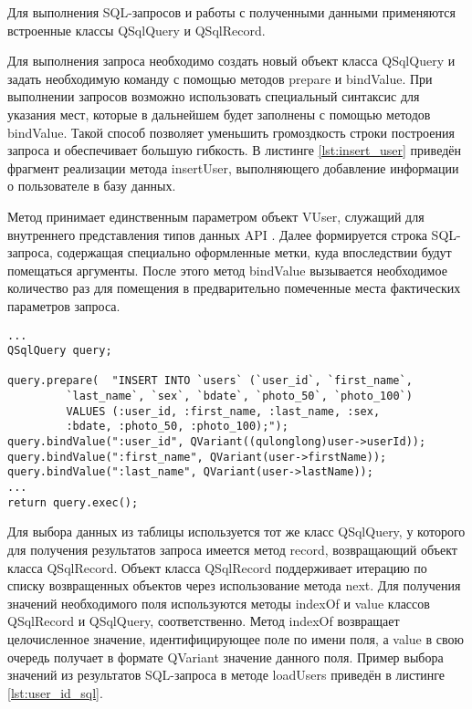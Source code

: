 Для выполнения SQL-запросов и работы с полученными данными применяются
встроенные классы QSqlQuery и QSqlRecord. 

Для выполнения запроса необходимо создать новый объект класса QSqlQuery и задать
необходимую команду с помощью методов prepare и bindValue. При выполнении
запросов возможно использовать специальный синтаксис для указания
мест, которые в дальнейшем будет заполнены с помощью методов bindValue. Такой
способ позволяет уменьшить громоздкость строки построения запроса и обеспечивает
большую гибкость. В листинге \ref{lst:insert_user} приведён фрагмент реализации
метода insertUser, выполняющего добавление информации о пользователе в базу данных.

Метод принимает единственным параметром объект VUser, служащий для внутреннего
представления типов данных API \vk{}. Далее формируется строка SQL-запроса,
содержащая специально оформленные метки, куда впоследствии будут помещаться
аргументы. После этого метод bindValue вызывается необходимое количество раз для
помещения в предварительно помеченные места фактических параметров запроса.

\noindent
\begin{minipage}{\linewidth}
\begin{lstlisting}[style = cstyle, 
				   caption = {Фрагмент реализации метода insertUser},
				   label = lst:insert_user] 
...
QSqlQuery query;

query.prepare(	"INSERT INTO `users` (`user_id`, `first_name`, 
	     `last_name`, `sex`, `bdate`, `photo_50`, `photo_100`)
	     VALUES (:user_id, :first_name, :last_name, :sex, 
	     :bdate, :photo_50, :photo_100);"); 
query.bindValue(":user_id", QVariant((qulonglong)user->userId));
query.bindValue(":first_name", QVariant(user->firstName));
query.bindValue(":last_name", QVariant(user->lastName));
...
return query.exec();
\end{lstlisting}
\end{minipage}

Для выбора данных из таблицы используется тот же класс QSqlQuery, у которого для
получения результатов запроса имеется метод record, возвращающий объект класса
QSqlRecord. Объект класса QSqlRecord поддерживает итерацию по списку
возвращенных объектов через использование метода next. Для получения значений
необходимого поля используются методы indexOf и value классов QSqlRecord и
QSqlQuery, соответственно. Метод indexOf возвращает целочисленное значение,
идентифицирующее поле по имени поля, а value в свою очередь получает в формате
QVariant значение данного поля. Пример выбора значений из результатов
SQL-запроса в методе loadUsers приведён в листинге \ref{lst:user_id_sql}.

